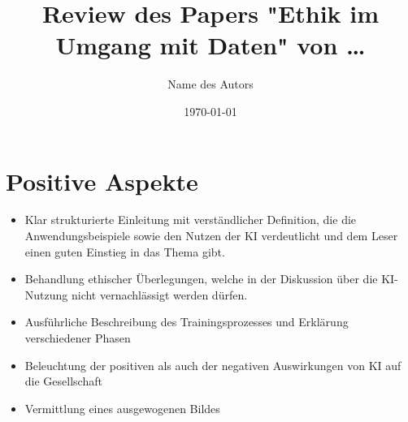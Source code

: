 \documentclass{article}
\title{Review des Papers "Ethik im Umgang mit Daten" von \dots}
\author{Name des Autors}
\date{\today}
\begin{document}
\maketitle


\section{Positive Aspekte}

\begin{itemize}

    \item Klar strukturierte Einleitung mit verständlicher Definition, die die Anwendungsbeispiele sowie den Nutzen der KI verdeutlicht und dem Leser einen guten Einstieg in das Thema gibt. 
    \item Behandlung ethischer Überlegungen, welche in der Diskussion über die KI-Nutzung nicht vernachlässigt werden dürfen. 
    \item Ausführliche Beschreibung des Trainingsprozesses und Erklärung verschiedener Phasen
    \item Beleuchtung der positiven als auch der negativen Auswirkungen von KI auf die Gesellschaft
    \item Vermittlung eines ausgewogenen Bildes 
    
\end{itemize}

\printbibliography
\end{document}
